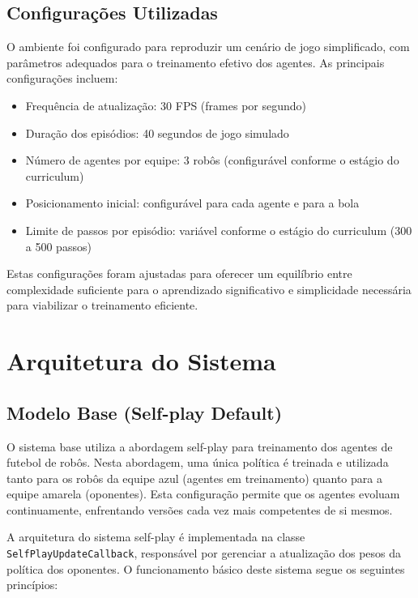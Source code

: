 \subsection{Configurações Utilizadas}

O ambiente foi configurado para reproduzir um cenário de jogo simplificado, com parâmetros adequados para o treinamento efetivo dos agentes. As principais configurações incluem:

\begin{itemize}
    \item Frequência de atualização: 30 FPS (frames por segundo)
    \item Duração dos episódios: 40 segundos de jogo simulado
    \item Número de agentes por equipe: 3 robôs (configurável conforme o estágio do curriculum)
    \item Posicionamento inicial: configurável para cada agente e para a bola
    \item Limite de passos por episódio: variável conforme o estágio do curriculum (300 a 500 passos)
\end{itemize}

Estas configurações foram ajustadas para oferecer um equilíbrio entre complexidade suficiente para o aprendizado significativo e simplicidade necessária para viabilizar o treinamento eficiente.

\section{Arquitetura do Sistema}
\label{sec:arquitetura_sistema}

\subsection{Modelo Base (Self-play Default)}

O sistema base utiliza a abordagem self-play para treinamento dos agentes de futebol de robôs. Nesta abordagem, uma única política é treinada e utilizada tanto para os robôs da equipe azul (agentes em treinamento) quanto para a equipe amarela (oponentes). Esta configuração permite que os agentes evoluam continuamente, enfrentando versões cada vez mais competentes de si mesmos.

A arquitetura do sistema self-play é implementada na classe \texttt{SelfPlayUpdateCallback}, responsável por gerenciar a atualização dos pesos da política dos oponentes. O funcionamento básico deste sistema segue os seguintes princípios:

